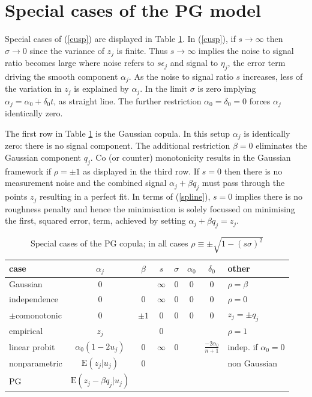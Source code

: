 \documentclass[authoryear]{elsarticle}
\newcommand{\E}{\mathrm{E}}
\newcommand{\eps}{\epsilon}
\newcommand{\eref}[1]{(\ref{#1})}
\newcommand{\tref}[1]{Table \ref{#1}}
\begin{document}
\section{Special cases of the PG model}  

Special cases of  \eref{cusp}  are displayed in \tref{pg}.   In \eref{cusp}, if $s\rightarrow\infty$ then $\sigma\rightarrow 0$   since the variance of $z_j$ is finite.    Thus $s\rightarrow\infty$  implies the noise to signal ratio becomes large where noise refers to   $s\eps_j$ and signal to $\eta_j$, the error term driving  the smooth component $\alpha_j$.   As the noise to signal ratio $s$ increases, less of the variation in $z_j$ is explained by $\alpha_j$.  In the limit $\sigma$ is zero implying $\alpha_j=\alpha_0+\delta_0 t$, as straight line.   The further restriction $\alpha_0=\delta_0=0$ forces $\alpha_j$ identically zero.



The first row in \tref{pg} is the  Gaussian copula.  In this setup $\alpha_j$ is identically zero: there is no  signal component.  The additional restriction $\beta=0$ eliminates the Gaussian component $q_j$.  Co (or counter) monotonicity results in the Gaussian framework if $\rho=\pm 1$ as displayed in the third row.
If $s= 0$ then there is no measurement noise and the combined signal $\alpha_j+\beta q_j$ must pass through the points $z_j$ resulting in a perfect fit.   In terms of \eref{spline}, $s=0$ implies there is no roughness penalty and hence the minimisation is solely focussed on minimising the first, squared error, term, achieved  by setting $\alpha_j+\beta q_j=z_j$. 
 
 \begin{table}[htdp]
\caption{Special cases of the PG copula; in all cases $\rho\equiv\pm\sqrt{1-(s\sigma)^2}$}\label{pg}
\begin{center}
\begin{tabular}{l|c|ccccc|l}
\hline
case& $\alpha_j$ & $\beta$ &$s$ & $\sigma$ & $\alpha_0$&$\delta_0$  & other\\
\hline
Gaussian & 0 &  & $\infty$ & $0$&  0&0 &$\rho=\beta$\\
independence &  0 & 0 & $\infty$&0 & 0 &0 &$\rho=0$\\
$\pm$comonotonic  & 0 &$\pm 1$ &0 & 0 &0 & 0 &$z_j=\pm q_j$  \\
empirical  & $z_j$ &  & $0$  &  &   &  &$\rho=1$ \\ 
linear probit &$\alpha_0(1-2u_j)$&  0 &  $\infty$ &0& & $\frac{-2\alpha_0}{n+1}$ &indep. if $\alpha_0=0$\\
nonparametric & $\E(z_j|u_j)$  & 0 & & & &  & non Gaussian \\
PG & $\E(z_j-\beta q_j|u_j)$ & & & & & &  \\
\hline
\end{tabular}
\end{center}
\end{table}%
\end{document}
